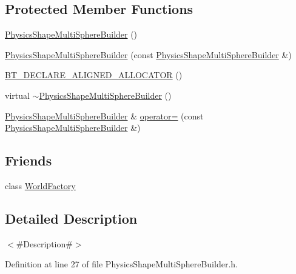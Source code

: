 \subsection*{Protected Member Functions}
\begin{DoxyCompactItemize}
\item 
\mbox{\hyperlink{classnjli_1_1_physics_shape_multi_sphere_builder_accc16cc7fb41728d9851eb08108434a1}{Physics\+Shape\+Multi\+Sphere\+Builder}} ()
\item 
\mbox{\hyperlink{classnjli_1_1_physics_shape_multi_sphere_builder_a69a89d86308bfc5353736675aa04497c}{Physics\+Shape\+Multi\+Sphere\+Builder}} (const \mbox{\hyperlink{classnjli_1_1_physics_shape_multi_sphere_builder}{Physics\+Shape\+Multi\+Sphere\+Builder}} \&)
\item 
\mbox{\hyperlink{classnjli_1_1_physics_shape_multi_sphere_builder_a45cc436914018c788a00dc31e7a0e119}{B\+T\+\_\+\+D\+E\+C\+L\+A\+R\+E\+\_\+\+A\+L\+I\+G\+N\+E\+D\+\_\+\+A\+L\+L\+O\+C\+A\+T\+OR}} ()
\item 
virtual \mbox{\hyperlink{classnjli_1_1_physics_shape_multi_sphere_builder_a34bee2df0fba8ae0628d9b1b6d86b564}{$\sim$\+Physics\+Shape\+Multi\+Sphere\+Builder}} ()
\item 
\mbox{\hyperlink{classnjli_1_1_physics_shape_multi_sphere_builder}{Physics\+Shape\+Multi\+Sphere\+Builder}} \& \mbox{\hyperlink{classnjli_1_1_physics_shape_multi_sphere_builder_a76d166e48aee7cbfd92c04df9b73dd80}{operator=}} (const \mbox{\hyperlink{classnjli_1_1_physics_shape_multi_sphere_builder}{Physics\+Shape\+Multi\+Sphere\+Builder}} \&)
\end{DoxyCompactItemize}
\subsection*{Friends}
\begin{DoxyCompactItemize}
\item 
class \mbox{\hyperlink{classnjli_1_1_physics_shape_multi_sphere_builder_acb96ebb09abe8f2a37a915a842babfac}{World\+Factory}}
\end{DoxyCompactItemize}


\subsection{Detailed Description}
$<$\#\+Description\#$>$ 

Definition at line 27 of file Physics\+Shape\+Multi\+Sphere\+Builder.\+h.




